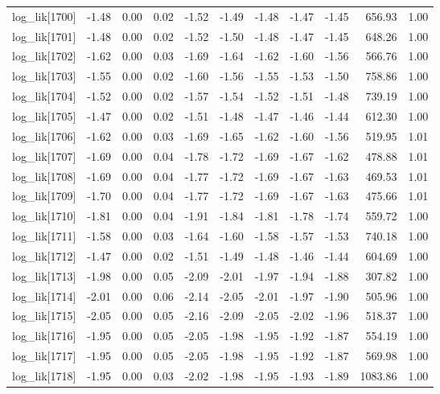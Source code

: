 \begin{table}[ht]
\begin{tabular}{rrrrrrrrrrr}
  log\_lik[1700] & -1.48 & 0.00 & 0.02 & -1.52 & -1.49 & -1.48 & -1.47 & -1.45 & 656.93 & 1.00 \\ 
  log\_lik[1701] & -1.48 & 0.00 & 0.02 & -1.52 & -1.50 & -1.48 & -1.47 & -1.45 & 648.26 & 1.00 \\ 
  log\_lik[1702] & -1.62 & 0.00 & 0.03 & -1.69 & -1.64 & -1.62 & -1.60 & -1.56 & 566.76 & 1.00 \\ 
  log\_lik[1703] & -1.55 & 0.00 & 0.02 & -1.60 & -1.56 & -1.55 & -1.53 & -1.50 & 758.86 & 1.00 \\ 
  log\_lik[1704] & -1.52 & 0.00 & 0.02 & -1.57 & -1.54 & -1.52 & -1.51 & -1.48 & 739.19 & 1.00 \\ 
  log\_lik[1705] & -1.47 & 0.00 & 0.02 & -1.51 & -1.48 & -1.47 & -1.46 & -1.44 & 612.30 & 1.00 \\ 
  log\_lik[1706] & -1.62 & 0.00 & 0.03 & -1.69 & -1.65 & -1.62 & -1.60 & -1.56 & 519.95 & 1.01 \\ 
  log\_lik[1707] & -1.69 & 0.00 & 0.04 & -1.78 & -1.72 & -1.69 & -1.67 & -1.62 & 478.88 & 1.01 \\ 
  log\_lik[1708] & -1.69 & 0.00 & 0.04 & -1.77 & -1.72 & -1.69 & -1.67 & -1.63 & 469.53 & 1.01 \\ 
  log\_lik[1709] & -1.70 & 0.00 & 0.04 & -1.77 & -1.72 & -1.69 & -1.67 & -1.63 & 475.66 & 1.01 \\ 
  log\_lik[1710] & -1.81 & 0.00 & 0.04 & -1.91 & -1.84 & -1.81 & -1.78 & -1.74 & 559.72 & 1.00 \\ 
  log\_lik[1711] & -1.58 & 0.00 & 0.03 & -1.64 & -1.60 & -1.58 & -1.57 & -1.53 & 740.18 & 1.00 \\ 
  log\_lik[1712] & -1.47 & 0.00 & 0.02 & -1.51 & -1.49 & -1.48 & -1.46 & -1.44 & 604.69 & 1.00 \\ 
  log\_lik[1713] & -1.98 & 0.00 & 0.05 & -2.09 & -2.01 & -1.97 & -1.94 & -1.88 & 307.82 & 1.00 \\ 
  log\_lik[1714] & -2.01 & 0.00 & 0.06 & -2.14 & -2.05 & -2.01 & -1.97 & -1.90 & 505.96 & 1.00 \\ 
  log\_lik[1715] & -2.05 & 0.00 & 0.05 & -2.16 & -2.09 & -2.05 & -2.02 & -1.96 & 518.37 & 1.00 \\ 
  log\_lik[1716] & -1.95 & 0.00 & 0.05 & -2.05 & -1.98 & -1.95 & -1.92 & -1.87 & 554.19 & 1.00 \\ 
  log\_lik[1717] & -1.95 & 0.00 & 0.05 & -2.05 & -1.98 & -1.95 & -1.92 & -1.87 & 569.98 & 1.00 \\ 
  log\_lik[1718] & -1.95 & 0.00 & 0.03 & -2.02 & -1.98 & -1.95 & -1.93 & -1.89 & 1083.86 & 1.00 \\ 

\end{tabular}
\end{table}
